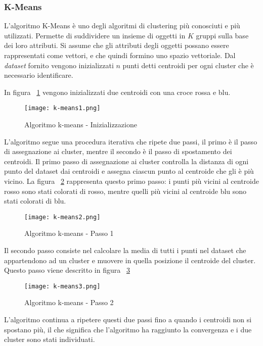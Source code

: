 \documentclass[../main.tex]{subfiles}
\begin{document}
\subsubsection{K-Means}
L'algoritmo K-Means è uno degli algoritmi di clustering più conosciuti e più utilizzati. Permette di suddividere un insieme di oggetti in $K$ gruppi sulla base dei loro attributi.
Si assume che gli attributi degli oggetti possano essere rappresentati come vettori, e che quindi formino uno spazio vettoriale. Dal \textit{dataset} fornito vengono inizializzati $n$ punti detti centroidi per ogni cluster che è necessario identificare.

In figura ~\ref{fig:means1} vengono inizializzati due centroidi con una croce rossa e blu.

\begin{figure}[H]
				\centering
				\texttt{[image: k-means1.png]}
				\caption{Algoritmo k-means - Inizializzazione}
				\label{fig:means1}
\end{figure}

L'algoritmo segue una procedura iterativa che ripete due passi, il primo è il passo di assegnazione ai cluster, mentre il secondo è il passo di spostamento dei centroidi.
Il primo passo di assegnazione ai cluster controlla la distanza di ogni punto del dataset dai centroidi e assegna ciascun punto al centroide che gli è più vicino. 
La figura ~\ref{fig:means2} rappresenta questo primo passo: i punti più vicini al centroide rosso sono stati colorati di rosso, mentre quelli più vicini al centroide blu sono stati colorati di blu.

\begin{figure}[H]
				\centering
				\texttt{[image: k-means2.png]}
				\caption{Algoritmo k-means - Passo 1}
				\label{fig:means2}
\end{figure}

Il secondo passo consiste nel calcolare la media di tutti i punti nel dataset che appartendono ad un cluster e muovere in quella posizione il centroide del cluster. Questo passo viene descritto in figura ~\ref{fig:means3}

\begin{figure}[H]
				\centering
				\texttt{[image: k-means3.png]}
				\caption{Algoritmo k-means - Passo 2}
				\label{fig:means3}
\end{figure}

L'algoritmo continua a ripetere questi due passi fino a quando i centroidi non si spostano più, il che significa che l'algoritmo ha raggiunto la convergenza e i due cluster sono stati individuati.
\end{document}
